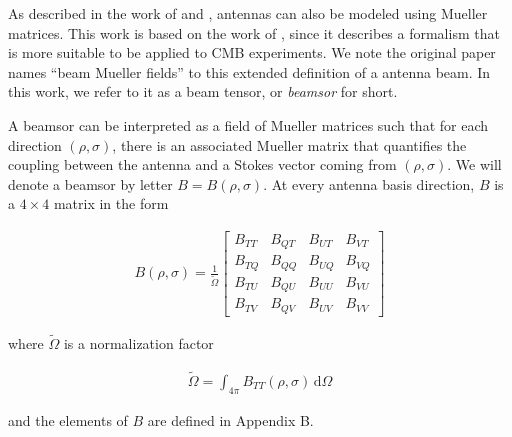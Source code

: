 \documentclass[a4paper,fleqn]{cas-dc}\sloppy
\begin{document}
\noindent
As described in the work of \cite{piepmeier_long_njoku_2008} and \cite{2007MNRAS.376.1767O}, antennas can also be modeled using Mueller matrices. This work is based on the work of \cite{2007MNRAS.376.1767O}, since it describes a formalism that is more suitable to be applied to CMB experiments. We note the original paper names ``beam Mueller fields'' to this extended definition of a antenna beam. In this work, we refer to it as a beam tensor, or \textsl{beamsor} for short.

A beamsor can be interpreted as a field of Mueller matrices such that for each direction $(\rho,\sigma)$, there is an associated Mueller matrix that quantifies the coupling between the antenna and a Stokes vector coming from $(\rho,\sigma)$. We will denote a beamsor by letter $B = B(\rho,\sigma)$. At every antenna basis direction, $B$ is a $4\times4$ matrix in the form

\begin{equation}
\begin{aligned}
B(\rho,\sigma) = \frac{1}{\tilde{\Omega}}
\begin{bmatrix}
B_{TT} & B_{QT} & B_{UT} & B_{VT}\\
B_{TQ} & B_{QQ} & B_{UQ} & B_{VQ}\\
B_{TU} & B_{QU} & B_{UU} & B_{VU}\\
B_{TV} & B_{QV} & B_{UV} & B_{VV}
\end{bmatrix}
\end{aligned}
\label{eq::beamsor}
\end{equation}

\noindent
where $\tilde{\Omega}$ is a normalization factor

\begin{equation}
\begin{aligned}
\tilde{\Omega} = \int_{4\pi} B_{TT}(\rho,\sigma) \, \mathrm{d} \Omega
\end{aligned}
\end{equation}

\noindent
and the elements of $B$ are defined in Appendix B. 
\end{document}

